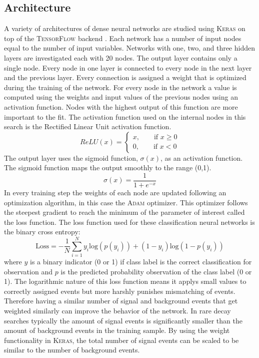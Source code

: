 \subsection{Architecture}

A variety of architectures of dense neural networks are studied using \textsc{Keras}\cite{Keras} on top of the \textsc{TensorFlow} backend \cite{TensorFlow}.  Each network has a number of input nodes equal to the number of input variables.  Networks with one, two, and three hidden layers are investigated each with 20 nodes.  The output layer contains only a single node.  Every node in one layer is connected to every node in the next layer and the previous layer.  Every connection is assigned a weight that is optimized during the training of the network.  For every node in the network a value is computed using the weights and input values of the previous nodes using an activation function.  Nodes with the highest output of this function are more important to the fit.  The activation function used on the internal nodes in this search is the Rectified Linear Unit activation function.
\[ ReLU(x) = 
\begin{cases}
x, \qquad \text{if } x \geq 0\\
0, \qquad \text{if } x < 0
\end{cases}
\]
The output layer uses the sigmoid function, $\sigma(x)$, as an activation function.  The sigmoid function maps the output smoothly to the range (0,1).
\[ \sigma(x) = \frac{1}{1+e^{-x}}
\]
In every training step the weights of each node are updated following an optimization algorithm, in this case the \textsc{Adam} optimizer\cite{AdamOpt}.  This optimizer follows the steepest gradient to reach the minimum of the parameter of interest called the loss function.  The loss function used for these classification neural networks is the binary cross entropy:
\[\text{Loss} = -\frac{1}{N}\sum_{i=1}^{N}y_{i} \text{log}(p(y_{i}))+(1-y_{i})\text{log}(1-p(y_{i}))\]
where $y$ is a binary indicator (0 or 1) if class label is the correct classification for observation and $p$ is the predicted probability observation of the class label (0 or 1).  The logarithmic nature of this loss function means it applys small values to correctly assigned events but more harshly punishes mismatching of events.  Therefore having a similar number of signal and background events that get weighted similarly can improve the behavior of the network.  In rare decay searches typically the amount of signal events is significantly smaller than the amount of background events in the training sample.  By using the weight functionality in \textsc{Keras}, the total number of signal events can be scaled to be similar to the number of background events. 

